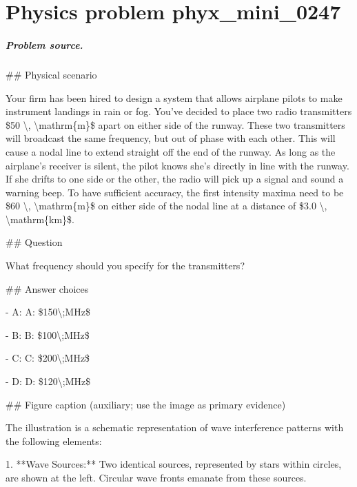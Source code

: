 
\chapter{Physics problem phyx\_mini\_0247}
\label{ch:PhyXMiniProblems_problem_phyx_mini_0247}

\paragraph{Problem source.}
\#\# Physical scenario

Your firm has been hired to design a system that allows airplane pilots to make instrument landings in rain or fog. You've decided to place two radio transmitters \$50 \textbackslash{}, \textbackslash{}mathrm\{m\}\$ apart on either side of the runway. These two transmitters will broadcast the same frequency, but out of phase with each other. This will cause a nodal line to extend straight off the end of the runway. As long as the airplane's receiver is silent, the pilot knows she's directly in line with the runway. If she drifts to one side or the other, the radio will pick up a signal and sound a warning beep. To have sufficient accuracy, the first intensity maxima need to be \$60 \textbackslash{}, \textbackslash{}mathrm\{m\}\$ on either side of the nodal line at a distance of \$3.0 \textbackslash{}, \textbackslash{}mathrm\{km\}\$.

\#\# Question

What frequency should you specify for the transmitters?

\#\# Answer choices

- A: A: \$150\textbackslash{};MHz\$

- B: B: \$100\textbackslash{};MHz\$

- C: C: \$200\textbackslash{};MHz\$

- D: D: \$120\textbackslash{};MHz\$

\#\# Figure caption (auxiliary; use the image as primary evidence)

The illustration is a schematic representation of wave interference patterns with the following elements:

1. **Wave Sources:** Two identical sources, represented by stars within circles, are shown at the left. Circular wave fronts emanate from these sources.

